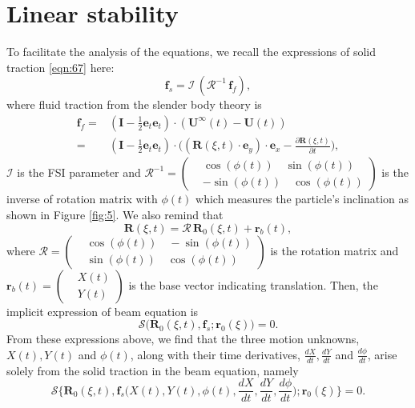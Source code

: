 \documentclass[a4paper,12pt]{report}
\begin{document}
\section{Linear stability}
To facilitate the analysis of the equations, we recall the expressions of solid traction \eqref{eqn:67} here:
\begin{equation}
	\label{eqn:104}
		\mathbf{f}_s=\mathcal{I}\,\left(\mathbf{\mathcal{R}}^{-1}\,\mathbf{f}_f\right),
\end{equation}
where fluid traction from the slender body theory is 
\begin{equation}
	\label{eqn:105}
	\begin{aligned}
		\mathbf{f}_f=&\left(\mathbf{I}-\frac{1}{2}\mathbf{e}_t\mathbf{e}_t\right)\cdot(\mathbf{U}^{\infty}(t)-\mathbf{U}(t))\\
		=&\left(\mathbf{I}-\frac{1}{2}\mathbf{e}_t\mathbf{e}_t\right)\cdot\Big((\mathbf{\mathbf{R}}(\xi,t)\cdot\mathbf{e}_y)\cdot\mathbf{e}_x-\frac{\partial\mathbf{R}(\xi,t)}{\partial t}\Big),
	\end{aligned}
\end{equation}
$\mathcal{I}$ is the FSI parameter and  $\mathbf{\mathcal{R}}^{-1}=\left(\begin{aligned}
	&\cos(\phi(t))\quad \sin(\phi(t)) \\
	&-\sin(\phi(t))\quad \cos(\phi(t))
\end{aligned}\right)$ is the inverse of rotation matrix with $\phi(t)$ which measures the particle's inclination as shown in Figure \ref{fig:5}. We also remind that 
\begin{equation}
	\mathbf{R}(\xi,t)=\mathbf{\mathcal{R}}\,\mathbf{R}_0(\xi,t)+\mathbf{r}_b(t),
\end{equation}
where $\mathbf{\mathcal{R}}=\left(\begin{aligned}
	&\cos(\phi(t))\quad -\sin(\phi(t)) \\
	&\sin(\phi(t))\quad \cos(\phi(t))
\end{aligned}\right)$ is the rotation matrix and $\mathbf{r}_b(t)=\left(\begin{aligned}
&X(t) \\
&Y(t)
\end{aligned}\right)$ is the base vector indicating translation.
Then, the implicit expression of beam equation is 
\begin{equation}
	\label{eqn:106}
	\mathbf{\mathcal{S}}\Big(\mathbf{R}_0(\xi,t),\mathbf{f}_s;\mathbf{r}_0(\xi)\Big)=0.
\end{equation}
From these expressions above, we find that the three motion unknowns, $X(t), Y(t)$ and $\phi(t)$, along with their time derivatives,  $\frac{dX}{dt}, \frac{dY}{dt}$ and $\frac{d\phi}{dt}$, arise solely from the solid traction in the beam equation, namely 	
\begin{equation}
	\label{eqn:107}
\mathbf{\mathcal{S}}\Big\{\mathbf{R}_0(\xi,t),\mathbf{f}_s\Big(X(t), Y(t),\phi(t),\frac{dX}{dt}, \frac{dY}{dt},\frac{d\phi}{dt}\Big);\mathbf{r}_0(\xi)\Big\}=0.
\end{equation}
\end{document}
